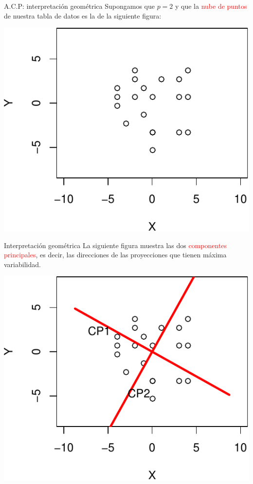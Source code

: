 \documentclass[
  ignorenonframetext,
]{beamer}
\newcommand\red[1]{\textcolor{red}{#1}}
\begin{document}
\begin{frame}{A.C.P: interpretación geométrica}
\protect\hypertarget{a.c.p-interpretaciuxf3n-geomuxe9trica}{}
Supongamos que \(p=2\) y que la \red{nube de puntos} de nuestra tabla de
datos es la de la siguiente figura:

\begin{center}\includegraphics{AnalisisComponentesPrincipales_fusion_files/figure-beamer/inter_geom1-1} \end{center}
\end{frame}

\begin{frame}{Interpretación geométrica}
\protect\hypertarget{interpretaciuxf3n-geomuxe9trica}{}
La siguiente figura muestra las dos \red{componentes principales}, es
decir, las direcciones de las proyecciones que tienen máxima
variabilidad.

\begin{center}\includegraphics{AnalisisComponentesPrincipales_fusion_files/figure-beamer/inter2-1} \end{center}
\end{frame}
\end{document}
